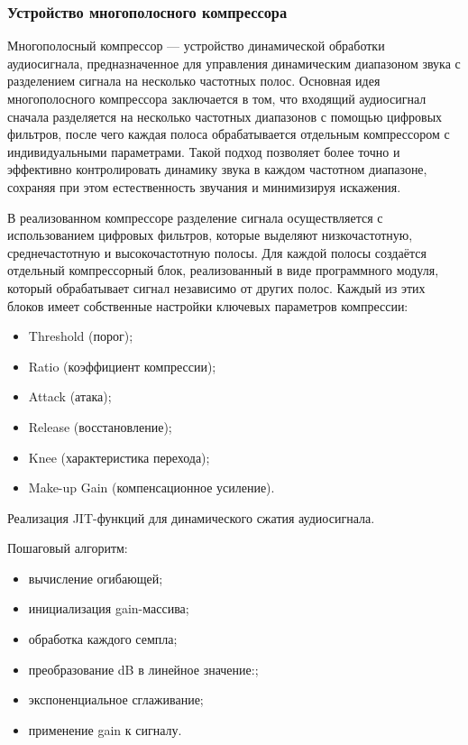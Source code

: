 \subsubsection{Устройство многополосного компрессора}

Многополосный компрессор — устройство динамической обработки аудиосигнала, предназначенное для управления динамическим диапазоном звука с разделением сигнала на несколько частотных полос. Основная идея многополосного компрессора заключается в том, что входящий аудиосигнал сначала разделяется на несколько частотных диапазонов с помощью цифровых фильтров, после чего каждая полоса обрабатывается отдельным компрессором с индивидуальными параметрами. Такой подход позволяет более точно и эффективно контролировать динамику звука в каждом частотном диапазоне, сохраняя при этом естественность звучания и минимизируя искажения.

В реализованном компрессоре разделение сигнала осуществляется с использованием цифровых фильтров, которые выделяют низкочастотную, среднечастотную и высокочастотную полосы. Для каждой полосы создаётся отдельный компрессорный блок, реализованный в виде программного модуля, который обрабатывает сигнал независимо от других полос. Каждый из этих блоков имеет собственные настройки ключевых параметров компрессии:
\begin{itemize}
	\item Threshold (порог);
	\item Ratio (коэффициент компрессии); 
	\item Attack (атака);
	\item Release (восстановление);
	\item Knee (характеристика перехода);
	\item Make-up Gain (компенсационное усиление).
\end{itemize}

Реализация JIT-функций для динамического сжатия аудиосигнала.

Пошаговый алгоритм:
\begin{itemize}
	\item вычисление огибающей;
	\item инициализация gain-массива;	
	\item обработка каждого семпла;
	\item преобразование dB в линейное значение:;
	\item экспоненциальное сглаживание;	
	\item применение gain к сигналу.
\end{itemize}

